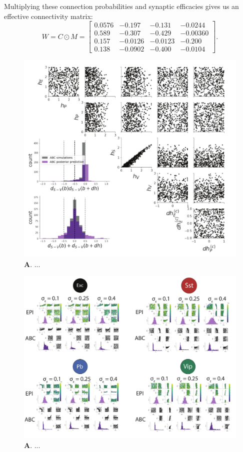 \documentclass[11pt]{article}
\begin{document}
Multiplying these connection probabilities and synaptic efficacies gives us an effective connectivity matrix:
\begin{equation}
W = C \odot M = \begin{bmatrix} 
0.0576 & -0.197 & -0.131 & -0.0244 \\
0.589 & -0.307 & -0.429 & -0.00360 \\
0.157 & -0.0126  & -0.0123 & -0.200 \\
0.138 & -0.0902 & -0.400 & -0.0104 \end{bmatrix}.
\end{equation}

\begin{figure}[h]
\caption{\small \textbf{A}. ...
 }\label{fig:drdh}
\begin{center}
\includegraphics[scale=.3]{figs/FigSabc/FigSabc.pdf}
\end{center}
\end{figure}


\begin{figure}[h]
\caption{\small \textbf{A}. ...
 }\label{fig:drdh}
\begin{center}
\includegraphics[scale=.12]{figs/FigSX/FigSX.pdf}
\end{center}
\end{figure}




\end{document}
